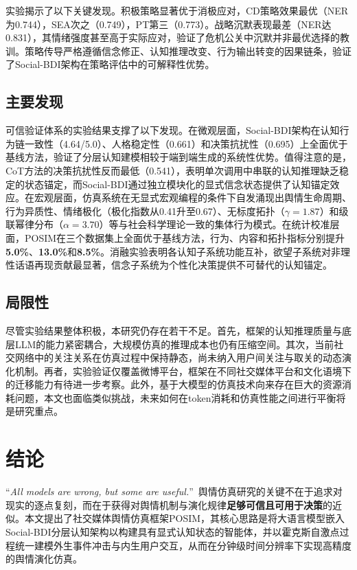 \documentclass[a4paper,fleqn]{cas-dc}
\begin{document}
实验揭示了以下关键发现。积极策略显著优于消极应对，CD策略效果最优（NER为0.744），SEA次之（0.749），PT第三（0.773）。战略沉默表现最差（NER达0.831），其情绪强度甚至高于实际应对，验证了危机公关中沉默并非最优选择的教训。策略传导严格遵循信念修正、认知推理改变、行为输出转变的因果链条，验证了Social-BDI架构在策略评估中的可解释性优势。

\subsection{主要发现}

可信验证体系的实验结果支撑了以下发现。在微观层面，Social-BDI架构在认知行为链一致性（4.64/5.0）、人格稳定性（0.661）和决策抗扰性（0.695）上全面优于基线方法，验证了分层认知建模相较于端到端生成的系统性优势。值得注意的是，CoT方法的决策抗扰性反而最低（0.541），表明单次调用中串联的认知推理缺乏稳定的状态锚定，而Social-BDI通过独立模块化的显式信念状态提供了认知锚定效应。在宏观层面，仿真系统在无显式宏观编程的条件下自发涌现出舆情生命周期、行为异质性、情绪极化（极化指数从0.41升至0.67）、无标度拓扑（$\gamma=1.87$）和级联幂律分布（$\alpha=3.70$）等与社会科学理论一致的集体行为模式。在统计校准层面，POSIM在三个数据集上全面优于基线方法，行为、内容和拓扑指标分别提升\textbf{5.0\%}、\textbf{13.0\%}和\textbf{8.5\%}。消融实验表明各认知子系统功能互补，欲望子系统对非理性话语再现贡献最显著，信念子系统为个性化决策提供不可替代的认知锚定。

\subsection{局限性}

尽管实验结果整体积极，本研究仍存在若干不足。首先，框架的认知推理质量与底层LLM的能力紧密耦合，大规模仿真的推理成本也仍有压缩空间。其次，当前社交网络中的关注关系在仿真过程中保持静态，尚未纳入用户间关注与取关的动态演化机制。再者，实验验证仅覆盖微博平台，框架在不同社交媒体平台和文化语境下的迁移能力有待进一步考察。此外，基于大模型的仿真技术向来存在巨大的资源消耗问题，本文也面临类似挑战，未来如何在token消耗和仿真性能之间进行平衡将是研究重点。

\section{结论}\label{sec:conclusion}

“\textit{All models are wrong, but some are useful.}”~\citep{box_draper_1987_emprical_modelbuilding}舆情仿真研究的关键不在于追求对现实的逐点复刻，而在于获得对舆情机制与演化规律\textbf{足够可信且可用于决策}的近似。本文提出了社交媒体舆情仿真框架POSIM，其核心思路是将大语言模型嵌入Social-BDI分层认知架构以构建具有显式认知状态的智能体，并以霍克斯自激点过程统一建模外生事件冲击与内生用户交互，从而在分钟级时间分辨率下实现高精度的舆情演化仿真。
\end{document}
